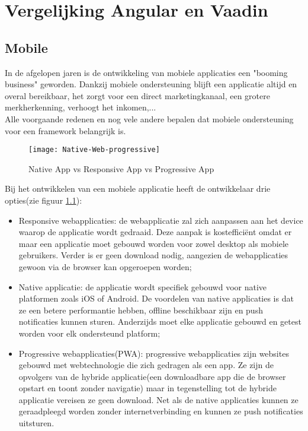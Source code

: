 \chapter{Vergelijking Angular en Vaadin}
\label{ch:angular}
\section{Mobile}
In de afgelopen jaren is de ontwikkeling van mobiele applicaties een "booming business" geworden. Dankzij mobiele ondersteuning blijft een applicatie altijd en overal bereikbaar, het zorgt voor een direct marketingkanaal, een grotere merkherkenning, verhoogt het inkomen,... \\
 Alle voorgaande redenen en nog vele andere bepalen dat mobiele ondersteuning voor een framework belangrijk is.

\begin{figure}[H]
	\centering
	\texttt{[image: Native-Web-progressive]}
	\caption{Native App vs Responsive App vs Progressive App \autocite{Solis2018}}
	\label{fig:native-responsive-web}
\end{figure}
Bij het ontwikkelen van een mobiele applicatie heeft de ontwikkelaar drie opties(zie figuur \ref{fig:native-responsive-web}):
\begin{itemize}
	\item Responsive webapplicaties: de webapplicatie zal zich aanpassen aan het device waarop de applicatie wordt gedraaid. Deze aanpak is kostefficiënt omdat er maar een applicatie moet gebouwd worden voor zowel desktop als mobiele gebruikers. Verder is er geen download nodig, aangezien de webapplicaties gewoon via de browser kan opgeroepen worden;
	\item Native applicatie: de applicatie wordt specifiek gebouwd voor native platformen zoals iOS of Android. De voordelen van native applicaties is dat ze een betere performantie hebben, offline beschikbaar zijn en push notificaties kunnen sturen. Anderzijds moet elke applicatie gebouwd en getest worden voor elk ondersteund platform;
	\item Progressive webapplicaties(PWA):  progressive webapplicaties zijn websites gebouwd met webtechnologie die zich gedragen als een app. Ze zijn de opvolgers van de hybride applicatie(een downloadbare app die de browser opstart en toont zonder navigatie) maar in tegenstelling tot de hybride applicatie vereisen ze geen download. Net als de native applicaties kunnen ze geraadpleegd worden zonder internetverbinding en kunnen ze push notificaties uitsturen. 
\end{itemize}

